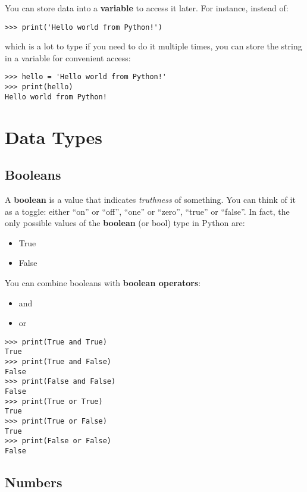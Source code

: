 You can store data into a \textbf{variable} to access it later. For
instance, instead of:

\begin{verbatim}
>>> print('Hello world from Python!')
\end{verbatim}

which is a lot to type if you need to do it multiple times, you can
store the string in a variable for convenient access:

\begin{verbatim}
>>> hello = 'Hello world from Python!'
>>> print(hello)
Hello world from Python!
\end{verbatim}

\section{Data Types}\label{data-types}

\subsection{Booleans}\label{booleans}

A \textbf{boolean} is a value that indicates \emph{truthness} of
something. You can think of it as a toggle: either ``on'' or ``off'',
``one'' or ``zero'', ``true'' or ``false''. In fact, the only possible
values of the \textbf{boolean} (or bool) type in Python are:

\begin{itemize}
\tightlist
\item
  True
\item
  False
\end{itemize}

You can combine booleans with \textbf{boolean operators}:

\begin{itemize}
\tightlist
\item
  and
\item
  or
\end{itemize}

\begin{verbatim}
>>> print(True and True)
True
>>> print(True and False)
False
>>> print(False and False)
False
>>> print(True or True)
True
>>> print(True or False)
True
>>> print(False or False)
False
\end{verbatim}

\subsection{Numbers}\label{numbers}

